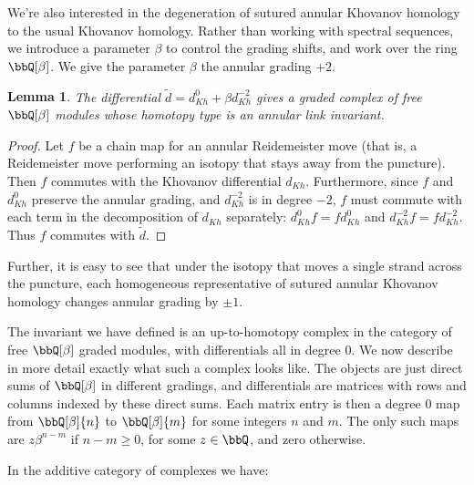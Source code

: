 \documentclass{amsart}
\theoremstyle{plain}
\newtheorem{lem}[prop]{Lemma}
\begin{document}
We're also interested in the degeneration of sutured annular Khovanov homology to the usual Khovanov homology. Rather than working with spectral sequences, we introduce a parameter $\beta$ to control the grading shifts, and work over the ring $\bbQ[\beta]$. We give the parameter $\beta$ the annular grading $+2$. 

\begin{lem}
The differential $\tilde{d}=d_{Kh}^0 + \beta d_{Kh}^{-2}$ gives a graded complex of free $\bbQ[\beta]$ modules whose homotopy type is an annular link invariant.
\end{lem}

\begin{proof}
Let $f$ be a chain map for an annular Reidemeister move (that is, a Reidemeister move performing an isotopy that stays away from the puncture).  Then $f$ commutes with the Khovanov differential $d_{Kh}$.  Furthermore, since $f$ and $d_{Kh}^0$ preserve the annular grading, and $d_{Kh}^{-2}$ is in degree $-2$, $f$ must commute with each term in the decomposition of $d_{Kh}$ separately: $d_{Kh}^0 f= f d_{Kh}^0$ and $d_{Kh}^{-2} f = f d_{Kh}^{-2}$.  Thus $f$ commutes with $\tilde{d}$.
\end{proof}

Further, it is easy to see that under the isotopy that moves a single strand across the puncture, each homogeneous representative of sutured annular Khovanov homology changes annular grading by $\pm 1$.

The invariant we have defined is an up-to-homotopy complex in the category of free $\bbQ[\beta]$ graded modules, with differentials all in degree 0. We now describe in more detail exactly what such a complex looks like.
The objects are just direct sums of $\bbQ[\beta]$ in different gradings, and differentials are matrices with rows and columns indexed by these direct sums. Each matrix entry is then a degree 0 map from $\bbQ[\beta]\{n\}$ to $\bbQ[\beta]\{m\}$ for some integers $n$ and $m$. The only such maps are $z \beta^{n-m}$ if $n-m \geq 0$, for some $z \in \bbQ$, and zero otherwise.

In the additive category of complexes we have:
\end{document}
